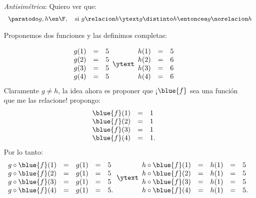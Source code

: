 \begin{enumerate}[label=\roman*)]
\begin{itemize}
                \bigskip

          \item[\textit{Antisimétrica}:] Quiero ver que:
                $$
                  \begin{array}{c}
                    \paratodo g, h \en \F,\quad  \text{si } g \relacion h \ytext g \distinto h \entonces g \norelacion h
                  \end{array}
                $$

                Proponemos dos funciones y las definimos completas:

                $$
                  \begin{array}{rcl}
                    g(1) & = & 5 \\
                    g(2) & = & 5 \\
                    g(3) & = & 5 \\
                    g(4) & = & 5
                  \end{array}
                  \ytext
                  \begin{array}{rcl}
                    h(1) & = & 5 \\
                    h(2) & = & 6 \\
                    h(3) & = & 6 \\
                    h(4) & = & 6
                  \end{array}
                $$
                Claramente $g \neq h$, la idea ahora es proponer que ¡$\blue{f}$ sea una función que me las relacione!
                propongo:
                $$
                  \begin{array}{rcl}
                    \blue{f}(1) & = & 1  \\
                    \blue{f}(2) & = & 1  \\
                    \blue{f}(3) & = & 1  \\
                    \blue{f}(4) & = & 1.
                  \end{array}
                $$
                Por lo tanto:
                $$
                  \begin{array}{rclcl}
                    g \circ \blue{f}(1) & = & g(1) & = & 5  \\
                    g \circ \blue{f}(2) & = & g(1) & = & 5  \\
                    g \circ \blue{f}(3) & = & g(1) & = & 5  \\
                    g \circ \blue{f}(4) & = & g(1) & = & 5.
                  \end{array}
                  \ytext
                  \begin{array}{rclcl}
                    h \circ \blue{f}(1) & = & h(1) & = & 5  \\
                    h \circ \blue{f}(2) & = & h(1) & = & 5  \\
                    h \circ \blue{f}(3) & = & h(1) & = & 5  \\
                    h \circ \blue{f}(4) & = & h(1) & = & 5.
                  \end{array}
                $$


\end{itemize}
\end{enumerate}
